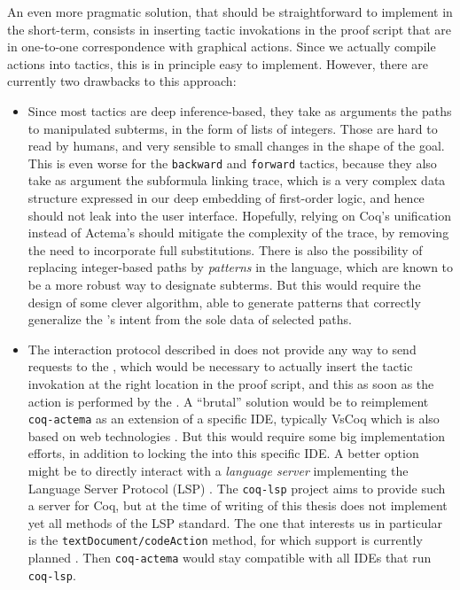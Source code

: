 An even more pragmatic solution, that should be straightforward to implement in
the short-term, consists in inserting tactic invokations in the proof script
that are in one-to-one correspondence with graphical actions. Since we actually
compile actions into tactics, this is in principle easy to implement. However,
there are currently two drawbacks to this approach:
\begin{itemize}
  \item Since most tactics are deep inference-based, they take as arguments the
  paths to manipulated subterms, in the form of lists of integers. Those are
  hard to read by humans, and very sensible to small changes in the shape of the
  goal. This is even worse for the \texttt{backward} and \texttt{forward}
  tactics, because they also take as argument the subformula linking trace,
  which is a very complex data structure expressed in our deep embedding of
  first-order logic, and hence should not leak into the user interface.
  Hopefully, relying on Coq's unification instead of Actema's should mitigate
  the complexity of the trace, by removing the need to incorporate full
  substitutions. There is also the possibility of replacing integer-based paths
  by \emph{patterns} in the {\ssreflect} language, which are known to be a more
  robust way to designate subterms. But this would require the design of some
  clever algorithm, able to generate patterns that correctly generalize the
  's intent from the sole data of selected paths.

  \item The interaction protocol described in  does not provide
  any way to send requests to the , which would be necessary to
  actually insert the tactic invokation at the right location in the proof
  script, and this as soon as the action is performed by the . A
  ``brutal'' solution would be to reimplement \texttt{coq-actema} as an
  extension of a specific IDE, typically VsCoq which is also based on web
  technologies \cite{VsCoq}. But this would require some big implementation
  efforts, in addition to locking the  into this specific IDE. A
  better option might be to directly interact with a \emph{language server}
  implementing the Language Server Protocol (LSP) \cite{LSP}. The
  \texttt{coq-lsp} project aims to provide such a server for Coq, but at the
  time of writing of this thesis does not implement yet all methods of the LSP
  standard. The one that interests us in particular is the
  \texttt{textDocument/codeAction} method, for which support is currently
  planned \cite{coq-lsp-proto}. Then \texttt{coq-actema} would stay compatible
  with all IDEs that run \texttt{coq-lsp}.
\end{itemize}